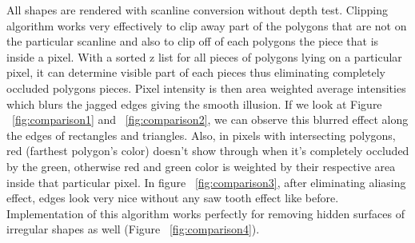 \documentclass{acmsiggraph}               %
\begin{document}
All shapes are rendered with scanline conversion without depth test. Clipping algorithm works very effectively to clip away part of the polygons that are not on the particular scanline and also to clip off of each polygons the piece that is inside a pixel. With a sorted z list for all pieces of polygons lying on a particular pixel, it can determine visible part of each pieces thus eliminating completely occluded polygons pieces. Pixel intensity is then area weighted average intensities which blurs the jagged edges giving the smooth illusion. If we look at Figure ~\ref{fig:comparison1} and ~\ref{fig:comparison2}, we can observe this blurred effect along the edges of rectangles and triangles. Also, in pixels with intersecting polygons, red (farthest polygon's color) doesn't show through when it's completely occluded by the green, otherwise red and green color is weighted by their respective area inside that particular pixel. In figure ~\ref{fig:comparison3}, after eliminating aliasing effect, edges look very nice without any saw tooth effect like before. Implementation of this algorithm works perfectly for removing hidden surfaces of irregular shapes as well (Figure ~\ref{fig:comparison4}). 




\nocite{*}

\end{document}
